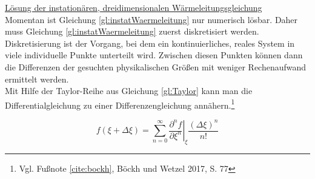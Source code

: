 \underline{Lösung der instationären, dreidimensionalen Wärmeleitungsgleichung}
\\

Momentan ist Gleichung \ref{gl:instatWaermeleitung} nur numerisch lösbar. Daher muss Gleichung \ref{gl:instatWaermeleitung} zuerst diskretisiert werden. Diskretisierung ist der Vorgang, bei dem ein kontinuierliches, reales System in viele individuelle Punkte unterteilt wird. Zwischen diesen Punkten können dann die Differenzen der gesuchten physikalischen Größen mit weniger Rechenaufwand ermittelt werden. \\
Mit Hilfe der Taylor-Reihe aus Gleichung \ref{gl:Taylor} kann man die Differentialgleichung zu einer Differenzengleichung annähern.\footnote{Vgl. Fußnote \ref{cite:bockh}, Böckh und Wetzel 2017, S. 77}

\begin{equation}
	f(\xi + \Delta \xi) = \sum_{n=0}^{\infty} \left.\frac{\partial^{n} f}{\partial \xi^{n}}\right\vert_{\xi} \frac{(\Delta \xi)^{n}}{n!} \label{gl:Taylor}
\end{equation}
